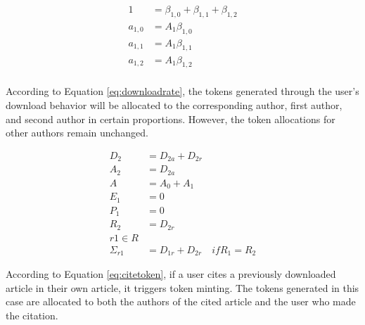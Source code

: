 \documentclass[lettersize,journal]{IEEEtran}
\begin{document}
\begin{equation}
  \begin{aligned}
    1 &= \beta_{1, 0} + \beta_{1, 1} + \beta_{1, 2} \\
    a_{1,0} &= A_1 \beta_{1, 0}  \\
    a_{1,1} &= A_1 \beta_{1, 1}  \\
    a_{1,2} &= A_1 \beta_{1, 2}  \\
  \end{aligned}
  \label{eq:downloadrate}
\end{equation}

According to Equation \ref{eq:downloadrate}, the tokens generated through the user's download behavior will be allocated to the corresponding author, first author, and second author in certain proportions. However, the token allocations for other authors remain unchanged.


\begin{equation}
  \begin{aligned}
    D_2 &= D_{2a} + D_{2r} \\
    A_2 &= D_{2a} \\
    A &= A_0 + A_1 \\
    E_1 &= 0 \\
    P_1 &= 0 \\
    R_2 &= D_{2r} \\
    r1 \in R \\
    \Sigma_{r1} & = D_{1r} + D_{2r} \quad if R_1 = R_2
  \end{aligned}
  \label{eq:citetoken}
\end{equation}

According to Equation \ref{eq:citetoken}, if a user cites a previously downloaded article in their own article, it triggers token minting. The tokens generated in this case are allocated to both the authors of the cited article and the user who made the citation.
\end{document}
